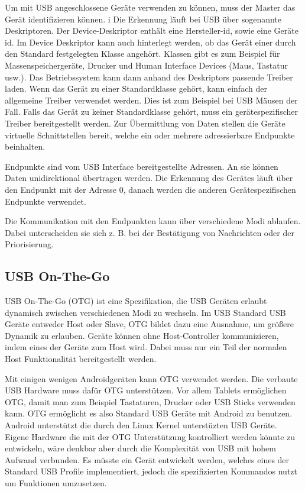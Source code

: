 \documentclass[12pt,journal,compsoc]{IEEEtran}
\begin{document}
Um mit USB angeschlossene Geräte verwenden zu können, muss der Master das Gerät identifizieren können. i
Die Erkennung läuft bei USB über sogenannte Deskriptoren. 
Der Device-Deskriptor enthält eine Hersteller-id, sowie eine Geräte id.
Im Device Deskriptor kann auch hinterlegt werden, ob das Gerät einer durch den Standard festgelegten Klasse angehört. 
Klassen gibt es zum Beispiel für Massenspeichergeräte, Drucker und Human Interface Devices (Maus, Tastatur usw.).
Das Betriebssystem kann dann anhand des Deskriptors passende Treiber laden. Wenn das Gerät zu einer Standardklasse gehört, kann einfach der allgemeine Treiber verwendet werden. Dies ist zum Beispiel bei USB Mäusen der Fall.
Falls das Gerät zu keiner Standardklasse gehört, muss ein gerätespezifischer Treiber bereitgestellt werden.
Zur Übermittlung von Daten stellen die Geräte virtuelle Schnittstellen bereit, welche ein oder mehrere adressierbare Endpunkte beinhalten. 

Endpunkte sind vom USB Interface bereitgestellte Adressen. An sie können Daten unidirektional übertragen werden.
Die Erkennung des Gerätes läuft über den Endpunkt mit der Adresse 0, danach werden die anderen Gerätespezifischen Endpunkte verwendet.

Die Kommunikation mit den Endpunkten kann über verschiedene Modi ablaufen.
Dabei unterscheiden sie sich z. B. bei der Bestätigung von Nachrichten oder der Priorisierung.  

\subsection{USB On-The-Go}
USB On-The-Go (OTG) ist eine Spezifikation, die USB Geräten erlaubt dynamisch zwischen verschiedenen Modi zu wechseln. 
Im USB Standard USB Geräte entweder Host oder Slave, OTG bildet dazu eine Ausnahme, um größere Dynamik zu erlauben.
Geräte können ohne Host-Controller kommunizieren, indem eines der Geräte zum Host wird.
Dabei muss nur ein Teil der normalen Host Funktionalität bereitgestellt werden.

Mit einigen wenigen Androidgeräten kann OTG verwendet werden. Die verbaute USB Hardware muss dafür OTG unterstützen.
Vor allem Tablets ermöglichen OTG, damit man zum Beispiel Tastaturen, Drucker oder USB Sticks verwenden kann.
OTG ermöglicht es also Standard USB Geräte mit Android zu benutzen. Android unterstützt die durch den Linux Kernel unterstüzten USB Geräte. Eigene Hardware die mit der OTG Unterstützung kontrolliert werden könnte zu entwickeln, wäre denkbar aber durch die Komplexität von USB mit hohem Aufwand verbunden.
Es müsste ein Gerät entwickelt werden, welches eines der Standard USB Profile implementiert, jedoch die spezifizierten Kommandos nutzt um Funktionen umzusetzen.
\end{document}

